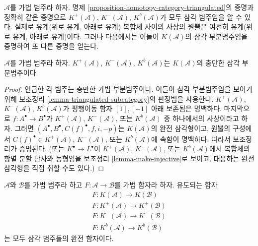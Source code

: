 \begin{remark}
\label{remark-boundedness-conditions-triangulated}
$\mathcal{A}$를 가법 범주라 하자. 명제
\ref{proposition-homotopy-category-triangulated}의 증명과 정확히
같은 증명으로 $K^{+}(\mathcal{A})$, $K^{-}(\mathcal{A})$,
$K^b(\mathcal{A})$가 모두 삼각 범주임을 알 수 있다. 실제로
유계(위로 유계, 아래로 유계) 복합체 사이의 사상의 원뿔은
여전히 유계(위로 유계, 아래로 유계)이다. 그러나 다음에서는 이들이
$K(\mathcal{A})$의 삼각 부분범주임을 증명하여 또 다른 증명을 얻는다.
\end{remark}

\begin{lemma}
\label{lemma-bounded-triangulated-subcategories}
$\mathcal{A}$를 가법 범주라 하자. $K^{+}(\mathcal{A})$,
$K^{-}(\mathcal{A})$, $K^b(\mathcal{A})$는 $K(\mathcal{A})$의
충만한 삼각 부분범주이다.
\end{lemma}

\begin{proof}
언급한 각 범주는 충만한 가법 부분범주이다. 이들이 삼각
부분범주임을 보이기 위해 보조정리
\ref{lemma-triangulated-subcategory}의 판정법을 사용한다.
$K^{+}(\mathcal{A})$, $K^{-}(\mathcal{A})$, $K^b(\mathcal{A})$가
평행이동 함자 $[1], [-1]$ 아래 보존됨은 명백하다. 마지막으로
$f : A^\bullet \to B^\bullet$가 $K^{+}(\mathcal{A})$, $K^{-}(\mathcal{A})$,
또는 $K^b(\mathcal{A})$ 중 하나에서의 사상이라고 하자. 그러면
$(A^\bullet, B^\bullet, C(f)^\bullet, f, i, -p)$는
$K(\mathcal{A})$의 완전 삼각형이고, 원뿔의 구성에서
$C(f)^\bullet \in K^{+}(\mathcal{A})$, $K^{-}(\mathcal{A})$,
또는 $K^b(\mathcal{A})$에 속함이 명백하다. 따라서 보조정리가
증명된다. (또는
$K^\bullet \to L^\bullet$이 $K^{+}(\mathcal{A})$, $K^{-}(\mathcal{A})$,
또는 $K^b(\mathcal{A})$에서 복합체의 항별 분할 단사와 동형임을
보조정리 \ref{lemma-make-injective}로 보이고, 대응하는 완전
삼각형을 직접 취할 수도 있다.)
\end{proof}

\begin{lemma}
\label{lemma-additive-exact-homotopy-category}
$\mathcal{A}$와 $\mathcal{B}$를 가법 범주라 하고
$F : \mathcal{A} \to \mathcal{B}$를 가법 함자라 하자. 유도되는 함자
$$
\begin{matrix}
F : K(\mathcal{A}) \longrightarrow K(\mathcal{B}) \\
F : K^{+}(\mathcal{A}) \longrightarrow K^{+}(\mathcal{B}) \\
F : K^{-}(\mathcal{A}) \longrightarrow K^{-}(\mathcal{B}) \\
F : K^b(\mathcal{A}) \longrightarrow K^b(\mathcal{B})
\end{matrix}
$$
는 모두 삼각 범주들의 완전 함자이다.
\end{lemma}

